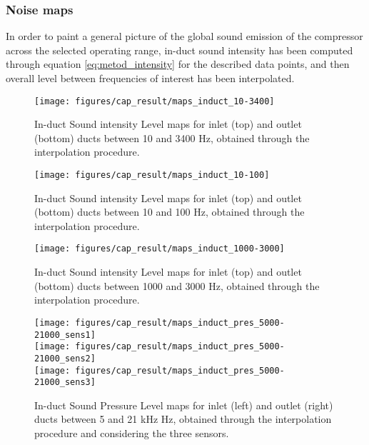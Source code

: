 \subsubsection{Noise maps}

In order to paint a general picture of the global sound emission of the compressor across the selected operating range, in-duct sound intensity has been computed through equation \ref{eq:metod_intensity} for the described data points, and then overall level between frequencies of interest has been interpolated. 

\begin{figure}[tbh!]
\centering
\texttt{[image: figures/cap\_result/maps\_induct\_10-3400]}
\vspace{-2.25cm}
\caption{In-duct Sound intensity Level maps for inlet (top) and outlet (bottom) ducts between 10 and 3400 Hz, obtained through the interpolation procedure.}
\label{fig:maps_induct_10-3400}
\end{figure}

\begin{figure}[tbh!]
\centering
\texttt{[image: figures/cap\_result/maps\_induct\_10-100]}
\vspace{-2.25cm}
\caption{In-duct Sound intensity Level maps for inlet (top) and outlet (bottom) ducts between 10 and 100 Hz, obtained through the interpolation procedure.}
\label{fig:maps_induct_10-100}
\end{figure}

\begin{figure}[tbh!]
\centering
\texttt{[image: figures/cap\_result/maps\_induct\_1000-3000]}
\vspace{-2.25cm}
\caption{In-duct Sound intensity Level maps for inlet (top) and outlet (bottom) ducts between 1000 and 3000 Hz, obtained through the interpolation procedure.}
\label{fig:maps_induct_1000-3000}
\end{figure}

\begin{figure}[tbh!]
\centering
\texttt{[image: figures/cap\_result/maps\_induct\_pres\_5000-21000\_sens1]}\\[4mm]
\texttt{[image: figures/cap\_result/maps\_induct\_pres\_5000-21000\_sens2]}\\[4mm]
\texttt{[image: figures/cap\_result/maps\_induct\_pres\_5000-21000\_sens3]}
\caption{In-duct Sound Pressure Level maps for inlet (left) and outlet (right) ducts between 5 and 21 kHz Hz, obtained through the interpolation procedure and considering the three sensors.}
\label{fig:maps_induct_SPL_3sens}
\end{figure}


